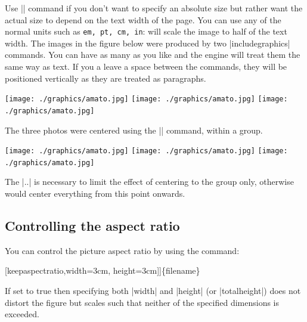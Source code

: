 Use |\textwidth| command if you don't want to specify an absolute size but rather want the actual size to depend on the text width of the page. You can use any of the normal \tex units such as \texttt{em, pt, cm, in}:
\noindent will scale the image to half of the text width. The images in the
figure below were produced by two |includegraphics| commands. You can have as many as you like and the \tex engine will treat them the same way as text. If you a leave a space between the commands, they will be positioned vertically as they are treated as paragraphs.

\medskip
\begingroup

\centering
\texttt{[image: ./graphics/amato.jpg]}
\texttt{[image: ./graphics/amato.jpg]}
\texttt{[image: ./graphics/amato.jpg]}

\endgroup


The three photos were centered using the |\centering| command, within a group.


\begin{teX}
\begingroup

\centering
\texttt{[image: ./graphics/amato.jpg]}
\texttt{[image: ./graphics/amato.jpg]}
\texttt{[image: ./graphics/amato.jpg]}
\endgroup
\end{teX}

The |\begingroup..\endgroup| is necessary to limit the effect of centering to
the group only, otherwise \tex would center everything from this point onwards.

\subsection{Controlling the aspect ratio}

You can control the picture aspect ratio by using the command:

[keepaspectratio,width=3cm, height=3cm]]\{filename\}


If set to true then specifying 
both |width| and |height| (or |totalheight|) does not distort the ﬁgure but 
scales such that neither of the speciﬁed dimensions is exceeded.






\medskip
\begingroup


